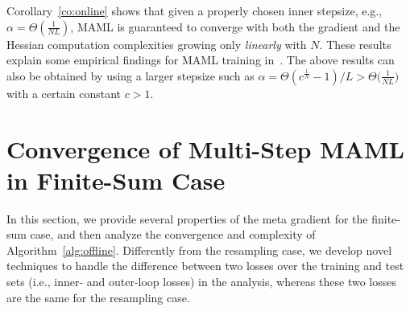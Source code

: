 \documentclass{osudissert96}
\begin{document}
 Corollary~\ref{co:online} shows that 
given a properly chosen inner stepsize, e.g., $\alpha = \Theta(\frac{1}{NL})$, MAML is guaranteed to converge 
 with both the gradient and the Hessian computation complexities growing only {\em linearly} with $N$. These results explain some empirical findings for MAML training in~\cite{rajeswaran2019meta}.  %
The above results can also be obtained by using a larger stepsize such as  $\alpha = \Theta(c^{\frac{1}{N}}-1)/L> \Theta\big(\frac{1}{NL}\big)$with a certain constant $c>1$. 

\section{Convergence of Multi-Step MAML in Finite-Sum Case}\label{theory:offline}
In this section, we provide several properties of the meta gradient for the finite-sum case, and then analyze the convergence and complexity of Algorithm~\ref{alg:offline}.  Differently from the resampling case, we develop novel techniques  to handle the difference between two losses over the training and  test sets (i.e., inner- and outer-loop losses) in the analysis, whereas these two losses are the same for the resampling case. 
\end{document}
